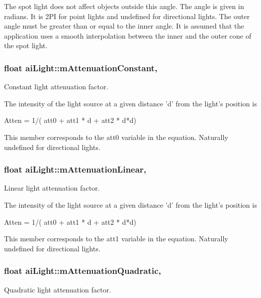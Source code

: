 The spot light does not affect objects outside this angle. The angle is given in radians. It is 2\+P\+I for point lights and undefined for directional lights. The outer angle must be greater than or equal to the inner angle. It is assumed that the application uses a smooth interpolation between the inner and the outer cone of the spot light. \hypertarget{structai_light_ae8804b3c309527ca0f85d676bab55710}{
\subsubsection[{m\+Attenuation\+Constant}]{\setlength{\rightskip}{0pt plus 5cm}float ai\+Light\+::m\+Attenuation\+Constant\hspace{0.3cm}{\ttfamily [get]}, {\ttfamily [set]}}}\label{structai_light_ae8804b3c309527ca0f85d676bab55710}
Constant light attenuation factor.

The intensity of the light source at a given distance 'd' from the light's position is 
\begin{DoxyCode}
Atten = 1/( att0 + att1 * d + att2 * d*d)
\end{DoxyCode}
 This member corresponds to the att0 variable in the equation. Naturally undefined for directional lights. \hypertarget{structai_light_aefda311eaa785ea345782dfa95be817c}{
\subsubsection[{m\+Attenuation\+Linear}]{\setlength{\rightskip}{0pt plus 5cm}float ai\+Light\+::m\+Attenuation\+Linear\hspace{0.3cm}{\ttfamily [get]}, {\ttfamily [set]}}}\label{structai_light_aefda311eaa785ea345782dfa95be817c}
Linear light attenuation factor.

The intensity of the light source at a given distance 'd' from the light's position is 
\begin{DoxyCode}
Atten = 1/( att0 + att1 * d + att2 * d*d)
\end{DoxyCode}
 This member corresponds to the att1 variable in the equation. Naturally undefined for directional lights. \hypertarget{structai_light_ab4fb07bfa40a807661b1ed1791838a6d}{
\subsubsection[{m\+Attenuation\+Quadratic}]{\setlength{\rightskip}{0pt plus 5cm}float ai\+Light\+::m\+Attenuation\+Quadratic\hspace{0.3cm}{\ttfamily [get]}, {\ttfamily [set]}}}\label{structai_light_ab4fb07bfa40a807661b1ed1791838a6d}
Quadratic light attenuation factor.

